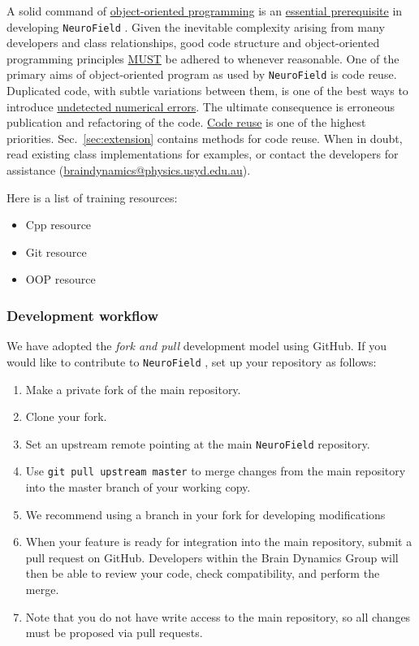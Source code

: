 \documentclass[12pt,a4paper]{article}
\newcommand{\type}[1]{ {\small\small\tt #1} }
\newcommand{\NF}[0]{ \type{NeuroField}}
\begin{document}
A solid command of \underline{object-oriented programming} is an \underline{essential prerequisite} in developing \NF. Given the inevitable complexity arising from many developers and class relationships, good code structure and object-oriented programming principles \underline{MUST} be adhered to whenever reasonable. One of the primary aims of object-oriented program as used by \NF is code reuse. Duplicated code, with subtle variations between them, is one of the best ways to introduce \underline{undetected numerical errors}. The ultimate consequence is erroneous publication and refactoring of the code. \underline{Code reuse} is one of the highest priorities. Sec.~\ref{sec:extension} contains methods for code reuse. When in doubt, read existing class implementations for examples, or contact the developers for assistance (\url{braindynamics@physics.usyd.edu.au}).

Here is a list of training resources:

\begin{itemize}
	\item Cpp resource
	\item Git resource 
	\item OOP resource
\end{itemize}

\subsubsection{Development workflow}

We have adopted the {\em fork and pull} development model using GitHub. If you would like to contribute to \NF, set up your repository as follows:

\begin{enumerate}
	\item Make a private fork of the main repository.
	\item Clone your fork.
	\item Set an upstream remote pointing at the main \NF repository.
	\item Use \type{git pull upstream master} to merge changes from the main repository into the master branch of your working copy.
	\item We recommend using a branch in your fork for developing modifications
	\item When your feature is ready for integration into the main repository, submit a pull request on GitHub. Developers within the Brain Dynamics Group will then be able to review your code, check compatibility, and perform the merge. 
	\item Note that you do not have write access to the main repository, so all changes must be proposed via pull requests.
\end{enumerate}
\end{document}
